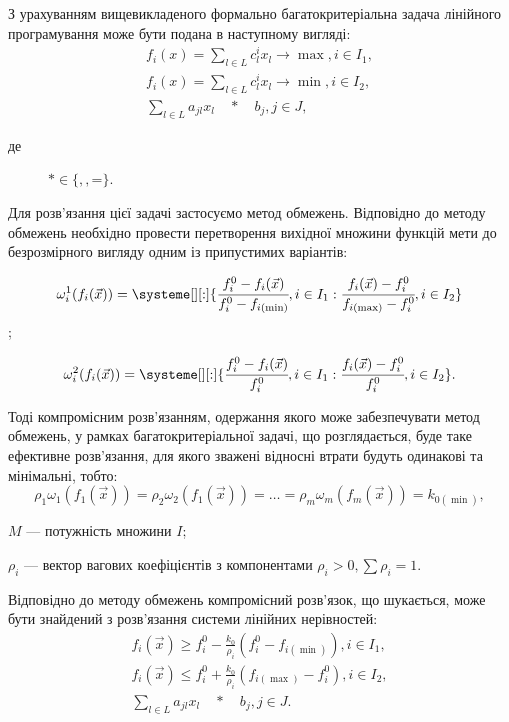 З урахуванням вищевикладеного формально багатокритеріальна задача лінійного програмування може бути подана в наступному вигляді:
\begin{gather*}
	f_i(x) = \sum_{l \in L}{c_l^i x_l} \to \max, i \in I_1, \\
	f_i(x) = \sum_{l \in L}{c_l^i x_l} \to \min, i \in I_2, \\
	\sum_{l \in L}{a_{jl} x_l \quad * \quad b_j}, j \in J,
\end{gather*}
\begin{description}
	\item[де] $* \in \{$\leq$, $\geq$, $=$\}$.
\end{description}

Для розв'язання цієї задачі застосуємо метод обмежень. 
Відповідно до методу обмежень необхідно провести перетворення вихідної множини функцій мети до безрозмірного вигляду одним із припустимих варіантів:
\begin{enumeration}
	\item \begin{equation} \omega^1_i(f_i(\vec{x})) = \systeme[][:]{
	\cfrac{f_i^0-f_i(\vec{x})}{f_i^0 - f_{i(\min)}},i \in I_1
	:
	\cfrac{f_i(\vec{x})-f_i^0}{f_{i(\max)} - f_i^0},i \in I_2
	}
	\end{equation}
	;
	\item \begin{equation} \omega^2_i(f_i(\vec{x})) = \systeme[][:]{
	\cfrac{f_i^0-f_i(\vec{x})}{f_i^0},i \in I_1
	:
	\cfrac{f_i(\vec{x})-f_i^0}{f_i^0},i \in I_2
	}
	.
	\end{equation}
\end{enumeration}

Тоді компромісним розв'язанням, одержання якого може забезпечувати метод обмежень, у рамках багатокритеріальної задачі, що розглядається, буде таке ефективне розв'язання, для якого зважені відносні втрати будуть одинакові та мінімальні, тобто:
\[
\rho_1 \omega_1 (f_1(\vec{x})) = \rho_2 \omega_2 (f_1(\vec{x})) = \ldots = \rho_m \omega_m (f_m(\vec{x})) = k_{0 (\min)},
\]
\begin{description}
	\item[де] $M$ --- потужність множини $I$; 
	\item $\rho_i$ --- вектор вагових коефіцієнтів з компонентами $\rho_i > 0, \sum{\rho_i} = 1$.
\end{description}

Відповідно до методу обмежень компромісний розв'язок, що шукається, може бути знайдений з розв'язання системи лінійних нерівностей:
\begin{gather*}
	f_i(\vec{x}) \geq f_{i}^0 - \frac{k_0}{\rho_i}(f_{i}^0 - f_{i(\min)}) , i \in I_1, \\
	f_i(\vec{x}) \leq f_{i}^0 + \frac{k_0}{\rho_i}(f_{i(\max)} - f_{i}^0 ), i \in I_2, \\
	\sum_{l \in L}{a_{jl} x_l \quad * \quad b_j}, j \in J.
\end{gather*}

